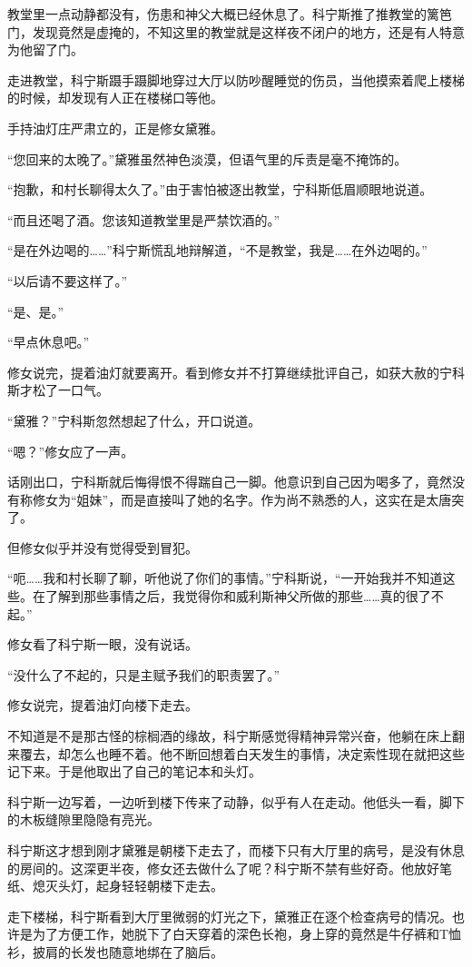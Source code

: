 教堂里一点动静都没有，伤患和神父大概已经休息了。科宁斯推了推教堂的篱笆门，发现竟然是虚掩的，不知这里的教堂就是这样夜不闭户的地方，还是有人特意为他留了门。

走进教堂，科宁斯蹑手蹑脚地穿过大厅以防吵醒睡觉的伤员，当他摸索着爬上楼梯的时候，却发现有人正在楼梯口等他。

手持油灯庄严肃立的，正是修女黛雅。

“您回来的太晚了。”黛雅虽然神色淡漠，但语气里的斥责是毫不掩饰的。

“抱歉，和村长聊得太久了。”由于害怕被逐出教堂，宁科斯低眉顺眼地说道。

“而且还喝了酒。您该知道教堂里是严禁饮酒的。”

“是在外边喝的……”科宁斯慌乱地辩解道，“不是教堂，我是……在外边喝的。”

“以后请不要这样了。”

“是、是。”

“早点休息吧。”

修女说完，提着油灯就要离开。看到修女并不打算继续批评自己，如获大赦的宁科斯才松了一口气。

“黛雅？”宁科斯忽然想起了什么，开口说道。

“嗯？”修女应了一声。

话刚出口，宁科斯就后悔得恨不得踹自己一脚。他意识到自己因为喝多了，竟然没有称修女为“姐妹”，而是直接叫了她的名字。作为尚不熟悉的人，这实在是太唐突了。

但修女似乎并没有觉得受到冒犯。

“呃……我和村长聊了聊，听他说了你们的事情。”宁科斯说，“一开始我并不知道这些。在了解到那些事情之后，我觉得你和威利斯神父所做的那些……真的很了不起。”

修女看了科宁斯一眼，没有说话。

“没什么了不起的，只是主赋予我们的职责罢了。”

修女说完，提着油灯向楼下走去。

不知道是不是那古怪的棕榈酒的缘故，科宁斯感觉得精神异常兴奋，他躺在床上翻来覆去，却怎么也睡不着。他不断回想着白天发生的事情，决定索性现在就把这些记下来。于是他取出了自己的笔记本和头灯。

科宁斯一边写着，一边听到楼下传来了动静，似乎有人在走动。他低头一看，脚下的木板缝隙里隐隐有亮光。

科宁斯这才想到刚才黛雅是朝楼下走去了，而楼下只有大厅里的病号，是没有休息的房间的。这深更半夜，修女还去做什么了呢？科宁斯不禁有些好奇。他放好笔纸、熄灭头灯，起身轻轻朝楼下走去。

走下楼梯，科宁斯看到大厅里微弱的灯光之下，黛雅正在逐个检查病号的情况。也许是为了方便工作，她脱下了白天穿着的深色长袍，身上穿的竟然是牛仔裤和T恤衫，披肩的长发也随意地绑在了脑后。

